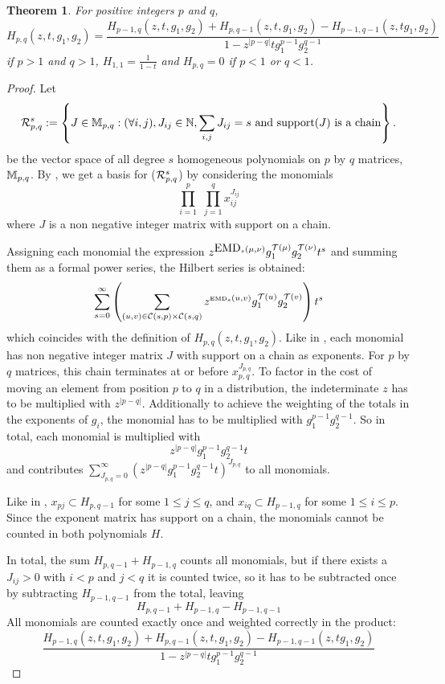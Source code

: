 \documentclass[12pt,letterpaper,oneside,openany]{book}
\newtheorem{theorem}[equation]{Theorem}
\begin{document}
\begin{theorem}\label{thm:HSg}
 	For positive integers $p$ and $q$,
 	\[ H_{p,q}(z,t, g_1, g_2) = \frac{ H_{p-1,q}(z,t, g_1, g_2) + H_{p,q-1}(z,t, g_1, g_2) - H_{p-1,q-1}(z,tg_1, g_2) }{1- z^{|p-q|} tg_1^{p-1}g_2^{q-1}}  \]
 	if $p>1$ and $q>1$, $H_{1,1} = \frac{1}{1-t}$ and $H_{p,q}=0$ if $p<1$ or $q<1$.
\end{theorem}
\begin{proof}
	Let 
	\[
	{\mathcal{R}}_{p,q}^s :=  \left\{ J \in {\mathbb{M}}_{p,q} :(\forall i,j), J_{ij} \in {\mathbb{N}}, \sum_{i,j} J_{ij} = s \mbox{ and support$(J)$ is a chain}   \right\}.
	\]
	be the vector space of all degree $s$ homogeneous polynomials on $p$ by $q$ matrices, ${\mathbb{M}}_{p,q}$. 
 	By \cite{bourn2019expected}, we get a basis for  (${\mathcal{R}}_{p,q}^s$) by considering the monomials
 	\[
 	\prod_{i=1}^p \, \, \prod_{j=1}^q x_{ij}^{J_{ij}}
 	\]
 	where $J$ is a non negative integer matrix with support on a chain.
 	
 	Assigning each monomial the expression $z^{{\mbox{EMD}_s}(\mu,\nu)} g_1^{{\mathcal{T}}(\mu)}g_2^{{\mathcal{T}}(\nu)}t^s$ and summing them as a formal power series, the Hilbert series is obtained:
 	\[
 	\sum_{s=0}^\infty \left( \sum_{(u,v) \in {\mathcal{C}}(s,p) \times {\mathcal{C}}(s,q)}
 	z^{\tiny {\mbox{EMD}_s}(u,v)}g_1^{{\mathcal{T}}(u)}g_2^{{\mathcal{T}}(v)} \right) t^s
 	\]
 	which coincides with the definition of $H_{p,q}(z, t, g_1, g_2)$. 
 	Like in \cite{bourn2019expected}, each monomial has non negative integer matrix $J$ with support on a chain as exponents. For $p$ by $q$ matrices, this chain terminates at or before $x_{p,q}^{J_{p,q}}$.
 	To factor in the cost of moving an element from position $p$ to $q$ in a distribution, the indeterminate $z$ has to be multiplied with $z^{|p-q|}$. Additionally to achieve the weighting of the totals in the exponents of $g_i$, the monomial has to be multiplied with $g_1^{p-1}g_2^{q-1}$. 
 	So in total, each monomial is multiplied with 
 	$$z^{|p-q|}g_1^{p-1}g_2^{q-1}t$$
 	and contributes $\sum_{J_{p,q}=0}^{\infty}(z^{|p-q|}g_1^{p-1}g_2^{q-1}t)^{J_{p,q}}$ to all monomials.
 	
 	Like in \cite{bourn2019expected}, $x_{pj} \subset H_{p,q-1}$ for some $1 \leq j \leq q$, and $x_{iq} \subset H_{p-1,q}$ for some $1 \leq i \leq p$. Since the exponent matrix has support on a chain, the monomials cannot be counted in both polynomials $H$.
 	
 	In total, the sum $H_{p,q-1}+H_{p-1,q}$ counts all monomials, but if there exists a $J_{ij}>0$ with $i<p$ and $j<q$ it is counted twice, so it has to be subtracted once by subtracting $H_{p-1, q-1}$ from the total, leaving
 	$$H_{p,q-1}+H_{p-1,q}-H_{p-1, q-1}$$
 	All monomials are counted exactly once and weighted correctly in the product:
 	\[ 
 		\frac{ H_{p-1,q}(z,t, g_1, g_2) + H_{p,q-1}(z,t, g_1, g_2) - H_{p-1,q-1}(z,tg_1, g_2) }{1- z^{|p-q|} tg_1^{p-1}g_2^{q-1}}  
 	\]
 	
 	
\end{proof}
\end{document}

